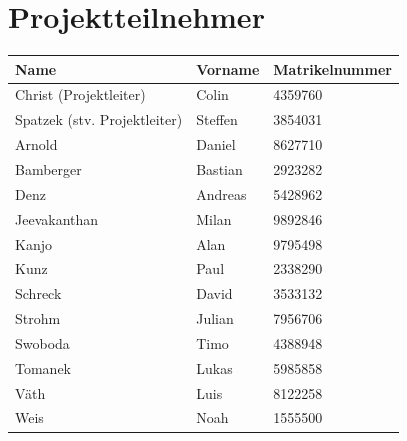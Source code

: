 \documentclass[%
	ngerman,
	12pt,
	a4paper,
	oneside,
	parskip=full
]{scrbook}
\begin{document}
\section{Projektteilnehmer}
\begin{tabular}{l|l|l}
	\textbf{Name}                & \textbf{Vorname} & \textbf{Matrikelnummer} \\ \hline
	Christ (Projektleiter)       & Colin            & 4359760                 \\
	Spatzek (stv. Projektleiter) & Steffen          & 3854031                 \\ \hline
	Arnold                       & Daniel           & 8627710                 \\
	Bamberger                    & Bastian          & 2923282                 \\
	Denz                         & Andreas          & 5428962                 \\
	Jeevakanthan                 & Milan            & 9892846                 \\
	Kanjo                        & Alan             & 9795498                 \\
	Kunz                         & Paul             & 2338290                 \\
	Schreck                      & David            & 3533132                 \\
	Strohm                       & Julian           & 7956706                 \\
	Swoboda                      & Timo             & 4388948                 \\
	Tomanek                      & Lukas            & 5985858                 \\
	Väth                         & Luis             & 8122258                 \\
	Weis                         & Noah             & 1555500
\end{tabular}

\tableofcontents
\end{document}
